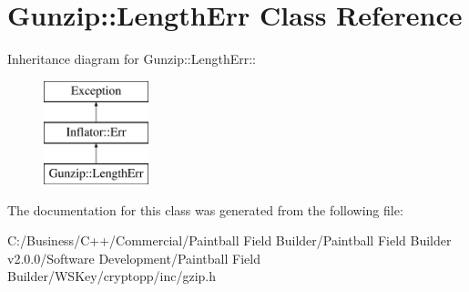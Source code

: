 \hypertarget{class_gunzip_1_1_length_err}{
\section{Gunzip::LengthErr Class Reference}
\label{class_gunzip_1_1_length_err}
}
Inheritance diagram for Gunzip::LengthErr::\begin{figure}[H]
\begin{center}
\leavevmode
\includegraphics[height=3cm]{class_gunzip_1_1_length_err}
\end{center}
\end{figure}


The documentation for this class was generated from the following file:\begin{DoxyCompactItemize}
\item 
C:/Business/C++/Commercial/Paintball Field Builder/Paintball Field Builder v2.0.0/Software Development/Paintball Field Builder/WSKey/cryptopp/inc/gzip.h\end{DoxyCompactItemize}
